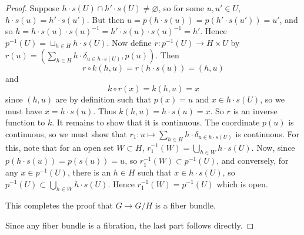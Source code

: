 \documentclass[reqno]{amsart}
\theoremstyle{definition}
\theoremstyle{remark}
\begin{document}
\begin{proof}
    Suppose
    $h \cdot s(U) \cap
    h' \cdot s(U) \neq \varnothing$, so for
    some $u,u' \in U$,
    $h\cdot s(u) = h' \cdot s(u')$. But then
    $u = p \left( h \cdot s(u) \right) =
    p\left( h' \cdot s(u') \right) 
    = u'$, and so
    $h = h \cdot s(u) \cdot s(u)^{-1} =
    h' \cdot s(u) \cdot s(u)^{-1} = h'$.
    Hence
    $p^{-1}(U) = 
    \sqcup_{h \in H} h\cdot s(U)$. Now define
    $r \colon p^{-1}(U) \to H \times U$ by
    $r (u) = \left( \sum_{h \in H}
    h \cdot \delta_{u \in h\cdot s(U)}, p(u) \right) $.
    Then
    \[
    r \circ k(h,u) =
    r \left( h \cdot s(u) \right) 
    = \left( h, u \right) 
    \] 
    and
    \[
    k \circ r \left( x \right) 
    = k \left( h,u \right) 
    = x
    \] 
    since $(h,u)$ are by definition such that
    $p(x) = u$ and
    $x \in h \cdot s(U)$, so we
    must have $x = h\cdot s (u)$. Thus
    $k (h,u) = h \cdot s(u) = x$. 
    So $r$ is an inverse function to $k$. It remains to show
    that it is continuous. The
    coordinate $p(u)$ is continuous, so
    we must show that
    $r_1 \colon u \mapsto \sum_{h \in H} h \cdot \delta_{u \in 
    h \cdot s(U)}$ is continuous. For this,
    note that for an open set
    $W \subset H$, $r_1^{-1} (W)
    = \bigcup_{h \in W} h\cdot s(U)$. Now,
    since $p \left( h \cdot s(u) \right) =
    p(s(u)) = u $, so
    $r_1^{-1}(W) \subset p^{-1}(U)$, and
    conversely, for any
    $x \in p^{-1}(U)$, there is an $h\in H$ such that
    $x \in h \cdot s(U)$, so
    $p^{-1}(U) \subset \bigcup_{h \in W}  h\cdot s(U)$.
    Hence $r_1^{-1}(W) = p^{-1}(U)$ which is open.
    
    This completes the proof that
    $G \to G /H$ is a fiber bundle.

    Since any fiber bundle is a fibration, the last part follows
    directly.


\end{proof}
\end{document}
